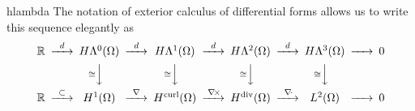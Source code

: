 \begin{Notation}{hlambda}
  The notation of exterior calculus of differential forms allows us to
  write this sequence elegantly as
  \begin{gather}\minCDarrowwidth20pt
    \begin{CD}
      \R
      @>{d}>> H\Lambda^0(\domain)
      @>{d}>> H\Lambda^1(\domain)
      @>{d}>> H\Lambda^2(\domain)
      @>{d}>> H\Lambda^3(\domain)
      @>>> 0
      \\
      @.
      @V{\cong}VV
      @V{\cong}VV
      @V{\cong}VV
      @V{\cong}VV
      \\
      \R
      @>{\subset}>> H^1(\domain)
      @>{\nabla}>> \Hcurl(\domain)
      @>{\curl}>> \Hdiv(\domain)
      @>{\div}>> L^2(\domain)
      @>>> 0
    \end{CD}
  \end{gather}
\end{Notation}
